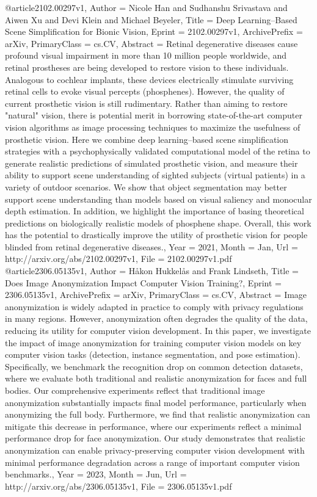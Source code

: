 @article{2102.00297v1,
Author        = {Nicole Han and Sudhanshu Srivastava and Aiwen Xu and Devi Klein and Michael Beyeler},
Title         = {Deep Learning--Based Scene Simplification for Bionic Vision},
Eprint        = {2102.00297v1},
ArchivePrefix = {arXiv},
PrimaryClass  = {cs.CV},
Abstract      = {Retinal degenerative diseases cause profound visual impairment in more than
10 million people worldwide, and retinal prostheses are being developed to
restore vision to these individuals. Analogous to cochlear implants, these
devices electrically stimulate surviving retinal cells to evoke visual percepts
(phosphenes). However, the quality of current prosthetic vision is still
rudimentary. Rather than aiming to restore "natural" vision, there is potential
merit in borrowing state-of-the-art computer vision algorithms as image
processing techniques to maximize the usefulness of prosthetic vision. Here we
combine deep learning--based scene simplification strategies with a
psychophysically validated computational model of the retina to generate
realistic predictions of simulated prosthetic vision, and measure their ability
to support scene understanding of sighted subjects (virtual patients) in a
variety of outdoor scenarios. We show that object segmentation may better
support scene understanding than models based on visual saliency and monocular
depth estimation. In addition, we highlight the importance of basing
theoretical predictions on biologically realistic models of phosphene shape.
Overall, this work has the potential to drastically improve the utility of
prosthetic vision for people blinded from retinal degenerative diseases.},
Year          = {2021},
Month         = {Jan},
Url           = {http://arxiv.org/abs/2102.00297v1},
File          = {2102.00297v1.pdf}
}
@article{2306.05135v1,
Author        = {Håkon Hukkelås and Frank Lindseth},
Title         = {Does Image Anonymization Impact Computer Vision Training?},
Eprint        = {2306.05135v1},
ArchivePrefix = {arXiv},
PrimaryClass  = {cs.CV},
Abstract      = {Image anonymization is widely adapted in practice to comply with privacy
regulations in many regions. However, anonymization often degrades the quality
of the data, reducing its utility for computer vision development. In this
paper, we investigate the impact of image anonymization for training computer
vision models on key computer vision tasks (detection, instance segmentation,
and pose estimation). Specifically, we benchmark the recognition drop on common
detection datasets, where we evaluate both traditional and realistic
anonymization for faces and full bodies. Our comprehensive experiments reflect
that traditional image anonymization substantially impacts final model
performance, particularly when anonymizing the full body. Furthermore, we find
that realistic anonymization can mitigate this decrease in performance, where
our experiments reflect a minimal performance drop for face anonymization. Our
study demonstrates that realistic anonymization can enable privacy-preserving
computer vision development with minimal performance degradation across a range
of important computer vision benchmarks.},
Year          = {2023},
Month         = {Jun},
Url           = {http://arxiv.org/abs/2306.05135v1},
File          = {2306.05135v1.pdf}
}
